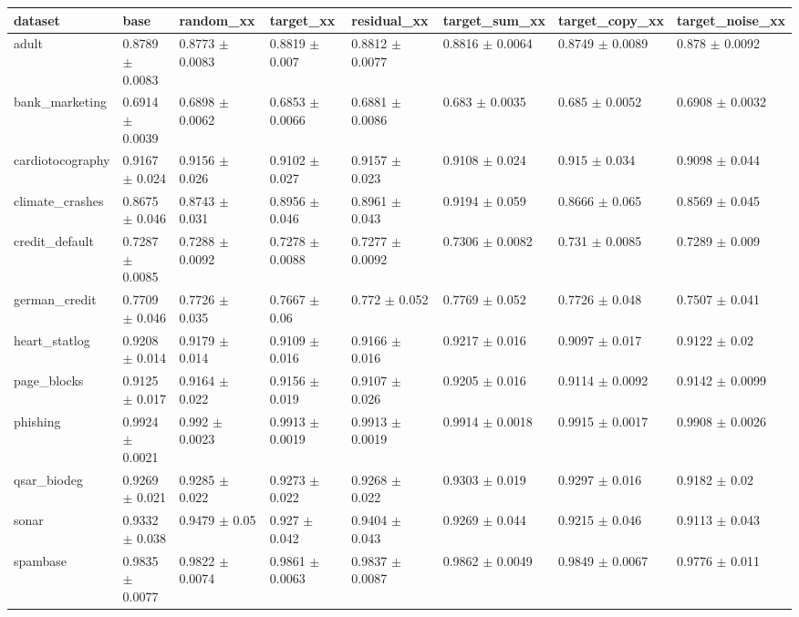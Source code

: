 \begin{tabular}{llllllll}
\toprule
dataset & base & random\_xx & target\_xx & residual\_xx & target\_sum\_xx & target\_copy\_xx & target\_noise\_xx \\
\midrule
adult & 0.8789 $\pm$ 0.0083 & 0.8773 $\pm$ 0.0083 & 0.8819 $\pm$ 0.007 & 0.8812 $\pm$ 0.0077 & 0.8816 $\pm$ 0.0064 & 0.8749 $\pm$ 0.0089 & 0.878 $\pm$ 0.0092 \\
bank\_marketing & 0.6914 $\pm$ 0.0039 & 0.6898 $\pm$ 0.0062 & 0.6853 $\pm$ 0.0066 & 0.6881 $\pm$ 0.0086 & 0.683 $\pm$ 0.0035 & 0.685 $\pm$ 0.0052 & 0.6908 $\pm$ 0.0032 \\
cardiotocography & 0.9167 $\pm$ 0.024 & 0.9156 $\pm$ 0.026 & 0.9102 $\pm$ 0.027 & 0.9157 $\pm$ 0.023 & 0.9108 $\pm$ 0.024 & 0.915 $\pm$ 0.034 & 0.9098 $\pm$ 0.044 \\
climate\_crashes & 0.8675 $\pm$ 0.046 & 0.8743 $\pm$ 0.031 & 0.8956 $\pm$ 0.046 & 0.8961 $\pm$ 0.043 & 0.9194 $\pm$ 0.059 & 0.8666 $\pm$ 0.065 & 0.8569 $\pm$ 0.045 \\
credit\_default & 0.7287 $\pm$ 0.0085 & 0.7288 $\pm$ 0.0092 & 0.7278 $\pm$ 0.0088 & 0.7277 $\pm$ 0.0092 & 0.7306 $\pm$ 0.0082 & 0.731 $\pm$ 0.0085 & 0.7289 $\pm$ 0.009 \\
german\_credit & 0.7709 $\pm$ 0.046 & 0.7726 $\pm$ 0.035 & 0.7667 $\pm$ 0.06 & 0.772 $\pm$ 0.052 & 0.7769 $\pm$ 0.052 & 0.7726 $\pm$ 0.048 & 0.7507 $\pm$ 0.041 \\
heart\_statlog & 0.9208 $\pm$ 0.014 & 0.9179 $\pm$ 0.014 & 0.9109 $\pm$ 0.016 & 0.9166 $\pm$ 0.016 & 0.9217 $\pm$ 0.016 & 0.9097 $\pm$ 0.017 & 0.9122 $\pm$ 0.02 \\
page\_blocks & 0.9125 $\pm$ 0.017 & 0.9164 $\pm$ 0.022 & 0.9156 $\pm$ 0.019 & 0.9107 $\pm$ 0.026 & 0.9205 $\pm$ 0.016 & 0.9114 $\pm$ 0.0092 & 0.9142 $\pm$ 0.0099 \\
phishing & 0.9924 $\pm$ 0.0021 & 0.992 $\pm$ 0.0023 & 0.9913 $\pm$ 0.0019 & 0.9913 $\pm$ 0.0019 & 0.9914 $\pm$ 0.0018 & 0.9915 $\pm$ 0.0017 & 0.9908 $\pm$ 0.0026 \\
qsar\_biodeg & 0.9269 $\pm$ 0.021 & 0.9285 $\pm$ 0.022 & 0.9273 $\pm$ 0.022 & 0.9268 $\pm$ 0.022 & 0.9303 $\pm$ 0.019 & 0.9297 $\pm$ 0.016 & 0.9182 $\pm$ 0.02 \\
sonar & 0.9332 $\pm$ 0.038 & 0.9479 $\pm$ 0.05 & 0.927 $\pm$ 0.042 & 0.9404 $\pm$ 0.043 & 0.9269 $\pm$ 0.044 & 0.9215 $\pm$ 0.046 & 0.9113 $\pm$ 0.043 \\
spambase & 0.9835 $\pm$ 0.0077 & 0.9822 $\pm$ 0.0074 & 0.9861 $\pm$ 0.0063 & 0.9837 $\pm$ 0.0087 & 0.9862 $\pm$ 0.0049 & 0.9849 $\pm$ 0.0067 & 0.9776 $\pm$ 0.011 \\

\end{tabular}
